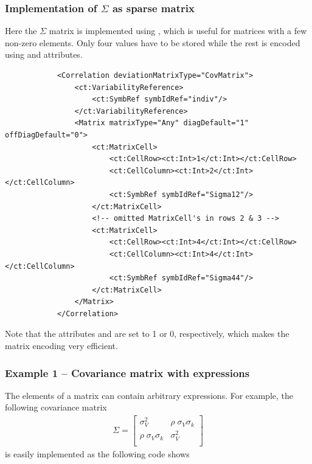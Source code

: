 \subsubsection{Implementation of $\Sigma$ as sparse matrix}
Here the $\Sigma$ matrix is implemented using , which is useful for matrices with a few non-zero elements. Only four 
values have to be stored while the rest is encoded using  and  attributes.
\lstset{language=XML}
\begin{lstlisting}
            <Correlation deviationMatrixType="CovMatrix">
                <ct:VariabilityReference>
                    <ct:SymbRef symbIdRef="indiv"/>
                </ct:VariabilityReference>
                <Matrix matrixType="Any" diagDefault="1" offDiagDefault="0">
                    <ct:MatrixCell>
                        <ct:CellRow><ct:Int>1</ct:Int></ct:CellRow>
                        <ct:CellColumn><ct:Int>2</ct:Int></ct:CellColumn>
                        <ct:SymbRef symbIdRef="Sigma12"/>
                    </ct:MatrixCell>
                    <!-- omitted MatrixCell's in rows 2 & 3 -->
                    <ct:MatrixCell>
                        <ct:CellRow><ct:Int>4</ct:Int></ct:CellRow>
                        <ct:CellColumn><ct:Int>4</ct:Int></ct:CellColumn>
                        <ct:SymbRef symbIdRef="Sigma44"/>
                    </ct:MatrixCell>
                </Matrix>
            </Correlation>
\end{lstlisting}  
Note that the attributes  and 
are set to 1 or 0, respectively, which makes the matrix encoding very efficient.

\subsubsection{Example 1 -- Covariance matrix with expressions}
The elements of a matrix can contain arbitrary expressions. For example, the following covariance matrix
\begin{align}
\Sigma = 
  \begin{bmatrix} 
  	\sigma_V^2  			& \rho\; \sigma_V \sigma_k \\
        \rho\; \sigma_V \sigma_k   	& \sigma_V^2 \nonumber \\
\end{bmatrix} 
\end{align}
is easily implemented as the following code shows

